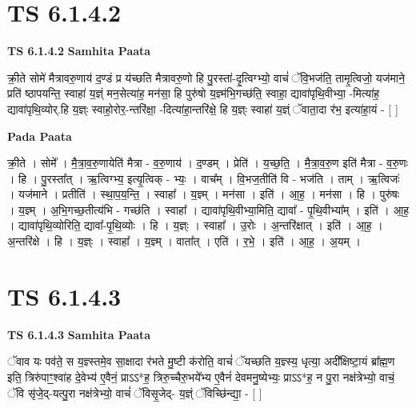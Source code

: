 \documentclass[17pt]{extarticle}
\begin{document}
\section*{ TS 6.1.4.2 }

\textbf{TS 6.1.4.2 } \newline
\textbf{Samhita Paata} \newline

क्री॒ते सोमे॑ मैत्रावरु॒णाय॑ द॒ण्डं प्र य॑च्छति मैत्रावरु॒णो हि पु॒रस्ता॑-दृ॒त्विग्भ्यो॒ वाचं॑ ॅवि॒भज॑ति॒ तामृ॒त्विजो॒ यज॑माने॒ प्रति॑ ष्ठापयन्ति॒ स्वाहा॑ य॒ज्ञ्ं मन॒सेत्या॑ह॒ मन॑सा॒ हि पुरु॑षो य॒ज्ञ्म॑भि॒गच्छ॑ति॒ स्वाहा॒ द्यावा॑पृथि॒वीभ्या॒ -मित्या॑ह॒ द्यावा॑पृथि॒व्योर्.हि य॒ज्ञ्ः स्वाहो॒रोर॒-न्तरि॑क्षा॒ -दित्या॑हा॒न्तरि॑क्षे॒ हि य॒ज्ञ्ः स्वाहा॑ य॒ज्ञ्ं ॅवाता॒दा र॑भ॒ इत्या॑हा॒यं - [  ] \newline

\textbf{Pada Paata} \newline

क्री॒ते । सोमे᳚ । मै॒त्रा॒व॒रु॒णायेति॑ मैत्रा - व॒रु॒णाय॑ । द॒ण्डम् । प्रेति॑ । य॒च्छ॒ति॒ । मै॒त्रा॒व॒रु॒ण इति॑ मैत्रा - व॒रु॒णः । हि । पु॒रस्ता᳚त् । ऋ॒त्विग्भ्य॒ इत्यृ॒त्विक् - भ्यः॒ । वाच᳚म् । वि॒भज॒तीति॑ वि - भज॑ति । ताम् । ऋ॒त्विजः॑ । यज॑माने । प्रतीति॑ । स्था॒प॒य॒न्ति॒ । स्वाहा᳚ । य॒ज्ञ्म् । मन॑सा । इति॑ । आ॒ह॒ । मन॑सा । हि । पुरु॑षः । य॒ज्ञ्म् । अ॒भि॒गच्छ॒तीत्य॑भि - गच्छ॑ति । स्वाहा᳚ । द्यावा॑पृथि॒वीभ्या॒मिति॒ द्यावा᳚ - पृ॒थि॒वीभ्या᳚म् । इति॑ । आ॒ह॒ । द्यावा॑पृथि॒व्योरिति॒ द्यावा᳚-पृ॒थि॒व्योः । हि । य॒ज्ञ्ः । स्वाहा᳚ । उ॒रोः । अ॒न्तरि॑क्षात् । इति॑ । आ॒ह॒ । अ॒न्तरि॑क्षे । हि । य॒ज्ञ्ः । स्वाहा᳚ । य॒ज्ञ्म् । वाता᳚त् । एति॑ । र॒भे॒ । इति॑ । आ॒ह॒ । अ॒यम् ।  \newline




\section*{ TS 6.1.4.3 }

\textbf{TS 6.1.4.3 } \newline
\textbf{Samhita Paata} \newline

ॅवाव यः पव॑ते॒ स य॒ज्ञ्स्तमे॒व सा॒क्षादा र॑भते मु॒ष्टी क॑रोति॒ वाचं॑ ॅयच्छति य॒ज्ञ्स्य॒ धृत्या॒ अदी᳚क्षिष्टा॒यं ब्रा᳚ह्म॒ण इति॒ त्रिरु॑पाꣳ॒॒श्वा॑ह दे॒वेभ्य॑ ए॒वैनं॒ प्राऽऽ*ह॒ त्रिरु॒च्चैरु॒भये᳚भ्य ए॒वैनं॑ देवमनु॒ष्येभ्यः॒ प्राऽऽ*ह॒ न पु॒रा नक्ष॑त्रेभ्यो॒ वाचं॒ ॅवि सृ॑जे॒द्-यत्पु॒रा नक्ष॑त्रेभ्यो॒ वाचं॑ ॅविसृ॒जेद्- य॒ज्ञ्ं ॅविच्छि॑न्द्या॒ - [  ] \newline
\end{document}

